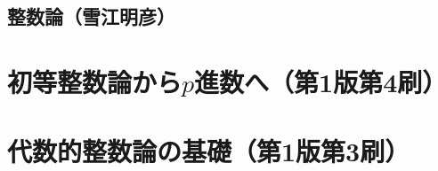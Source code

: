 \documentclass[a4paper]{ltjsreport}
\begin{document}
\chapter*{整数論（雪江明彦）}
\printbibliography
\tableofcontents
\part{初等整数論から$p$進数へ（第1版第4刷）}

\part{代数的整数論の基礎（第1版第3刷）}



\end{document}
